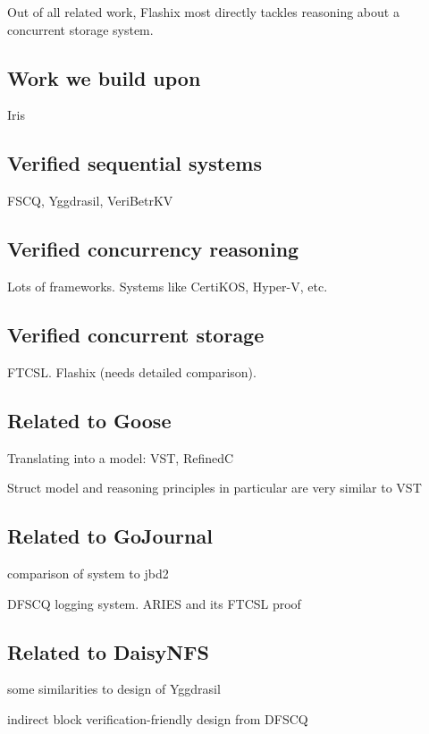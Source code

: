 Out of all related work, Flashix most directly tackles reasoning about a
concurrent storage system.

\hypertarget{work-we-build-upon}{%
\subsection{Work we build upon}\label{work-we-build-upon}}

Iris

\hypertarget{verified-sequential-systems}{%
\subsection{Verified sequential
systems}\label{verified-sequential-systems}}

FSCQ, Yggdrasil, VeriBetrKV

\hypertarget{verified-concurrency-reasoning}{%
\subsection{Verified concurrency
reasoning}\label{verified-concurrency-reasoning}}

Lots of frameworks. Systems like CertiKOS, Hyper-V, etc.

\hypertarget{verified-concurrent-storage}{%
\subsection{Verified concurrent
storage}\label{verified-concurrent-storage}}

FTCSL. Flashix (needs detailed comparison).

\hypertarget{related-to-goose}{%
\subsection{Related to Goose}\label{related-to-goose}}

Translating into a model: VST, RefinedC

Struct model and reasoning principles in particular are very similar to
VST

\hypertarget{related-to-gojournal}{%
\subsection{Related to GoJournal}\label{related-to-gojournal}}

comparison of system to jbd2

DFSCQ logging system. ARIES and its FTCSL proof

\hypertarget{related-to-daisynfs}{%
\subsection{Related to DaisyNFS}\label{related-to-daisynfs}}

some similarities to design of Yggdrasil

indirect block verification-friendly design from DFSCQ

